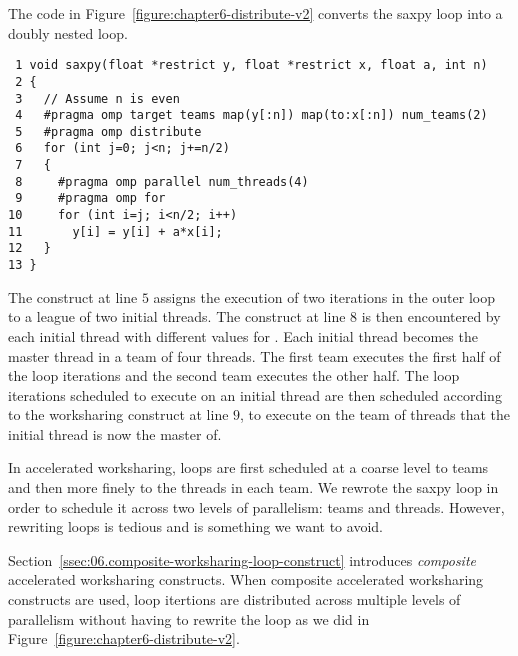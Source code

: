 The code in Figure~\ref{figure:chapter6-distribute-v2} converts the saxpy loop
into a doubly nested loop.  

\begin{figure*}[!tbh]
\begin{verbatim}
 1 void saxpy(float *restrict y, float *restrict x, float a, int n)
 2 {
 3   // Assume n is even
 4   #pragma omp target teams map(y[:n]) map(to:x[:n]) num_teams(2) 
 5   #pragma omp distribute
 6   for (int j=0; j<n; j+=n/2)
 7   {
 8     #pragma omp parallel num_threads(4)
 9     #pragma omp for
10     for (int i=j; i<n/2; i++)
11       y[i] = y[i] + a*x[i];
12   }
13 }
\end{verbatim}
\caption{ \textbf {Example of worksharing a loop across two levels of
                   parallelism} -- \small
          Use team level parallelism on the outer loop and thread level
          parallelism on the inner loop.  Distribute the loop iterations to two
          teams.  Each team then uses four threads to execute the iterations
          that are assigned to it.  
         }
\label{figure:chapter6-distribute-v2}
\end{figure*}

The  construct at line $5$ assigns the execution of two
iterations in the outer loop to a league of two initial threads.  The
 construct at line $8$ is then encountered by each initial
thread with different values for .  Each initial thread becomes the master
thread in a team of four threads.  The first team executes the first half of
the loop iterations and the second team executes the other half.  The loop
iterations scheduled to execute on an initial thread are then scheduled
according to the  worksharing construct at line $9$, to execute on
the team of threads that the initial thread is now the master of.

In accelerated worksharing, loops are first scheduled at a coarse level to
teams and then more finely to the threads in each team.  We rewrote the saxpy
loop in order to schedule it across two levels of parallelism: teams and
threads.  However, rewriting loops is tedious and is something we want to avoid.

Section~\ref{ssec:06.composite-worksharing-loop-construct} introduces
\emph{composite} accelerated worksharing constructs.  When composite
accelerated worksharing constructs are used, loop itertions are distributed
across multiple levels of parallelism without having to rewrite the loop as we
did in Figure~\ref{figure:chapter6-distribute-v2}.  

